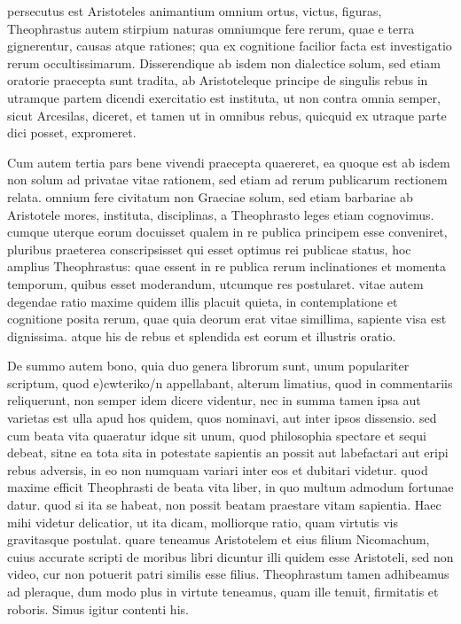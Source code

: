  persecutus est Aristoteles animantium omnium ortus, victus, figuras, Theophrastus autem stirpium naturas omniumque fere rerum, quae e terra gignerentur, causas atque rationes; qua ex cognitione facilior facta est investigatio rerum occultissimarum. Disserendique ab isdem non dialectice solum, sed etiam oratorie praecepta sunt tradita, ab Aristoteleque principe de singulis rebus in utramque partem dicendi exercitatio est instituta, ut non contra omnia semper, sicut Arcesilas, diceret, et tamen ut in omnibus rebus, quicquid ex utraque parte dici posset, expromeret.

 Cum autem tertia pars bene vivendi praecepta quaereret, ea quoque est ab isdem non solum ad privatae vitae rationem, sed etiam ad rerum publicarum rectionem relata. omnium fere civitatum non Graeciae solum, sed etiam barbariae ab Aristotele mores, instituta, disciplinas, a Theophrasto leges etiam cognovimus. cumque uterque eorum docuisset qualem in re publica principem esse conveniret, pluribus praeterea conscripsisset qui esset optimus rei publicae status, hoc amplius Theophrastus: quae essent in re publica rerum inclinationes et momenta temporum, quibus esset moderandum, utcumque res postularet. vitae autem degendae ratio maxime quidem illis placuit quieta, in contemplatione et cognitione posita rerum, quae quia deorum erat vitae simillima, sapiente visa est dignissima. atque his de rebus et splendida est eorum et illustris oratio.

 De summo autem bono, quia duo genera librorum sunt, unum populariter scriptum, quod e)cwteriko/n appellabant, alterum limatius, quod in commentariis reliquerunt, non semper idem dicere videntur, nec in summa tamen ipsa aut varietas est ulla apud hos quidem, quos nominavi, aut inter ipsos dissensio. sed cum beata vita quaeratur idque sit unum, quod philosophia spectare et sequi debeat, sitne ea tota sita in potestate sapientis an possit aut labefactari aut eripi rebus adversis, in eo non numquam variari inter eos et dubitari videtur. quod maxime efficit Theophrasti de beata vita liber, in quo multum admodum fortunae datur. quod si ita se habeat, non possit beatam praestare vitam sapientia. Haec mihi videtur delicatior, ut ita dicam, molliorque ratio, quam virtutis vis gravitasque postulat. quare teneamus Aristotelem et eius filium Nicomachum, cuius accurate scripti de moribus libri dicuntur illi quidem esse Aristoteli, sed non video, cur non potuerit patri similis esse filius. Theophrastum tamen adhibeamus ad pleraque, dum modo plus in virtute teneamus, quam ille tenuit, firmitatis et roboris. Simus igitur contenti his.

